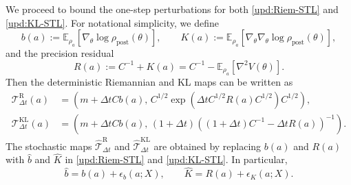 \documentclass[11pt]{article}
\theoremstyle{plain}
\theoremstyle{definition}
\theoremstyle{remark}
\newcommand{\E}{\mathbb{E}}
\newcommand{\post}{\mathrm{post}}
\begin{document}
We proceed to bound the one-step perturbations for both \eqref{upd:Riem-STL} and \eqref{upd:KL-STL}. For notational simplicity, we define
\begin{equation*}
    b(a) := \E_{\rho_a}[\nabla_\theta \log \rho_\post(\theta)], \qquad 
    K(a) := \E_{\rho_a}[\nabla_\theta\nabla_\theta \log \rho_\post(\theta)],
\end{equation*}
and the precision residual
\begin{equation*}
    R(a) := C^{-1} + K(a) = C^{-1} - \E_{\rho_a}[\nabla^2 V(\theta)].
\end{equation*}
Then the deterministic Riemannian and KL maps can be written as
\begin{align*}
    \mathcal{T}_{\Delta t}^{\mathrm R}(a)
    &=
    \left(
        m+\Delta t C b(a),
        \,
        C^{1/2}
        \exp\left(
            \Delta t C^{1/2}R(a)C^{1/2}
        \right)
        C^{1/2}
    \right), \\
    \mathcal{T}_{\Delta t}^{\mathrm{KL}}(a)
    &=
    \left(
        m+\Delta t C b(a),
        \,
        (1+\Delta t)
        \left(
            (1+\Delta t)C^{-1}-\Delta t R(a)
        \right)^{-1}
    \right).
\end{align*}
The stochastic maps $\widehat{\mathcal{T}}_{\Delta t}^{\mathrm R}$ and $\widehat{\mathcal{T}}_{\Delta t}^{\mathrm{KL}}$ are obtained by replacing $b(a)$ and $R(a)$ with $\hat b$ and $\widehat K$ in \eqref{upd:Riem-STL} and \eqref{upd:KL-STL}. In particular,
\begin{equation*}
    \hat b = b(a)+\epsilon_b(a;X), \qquad 
    \widehat K = R(a)+\epsilon_K(a;X).
\end{equation*}
\end{document}
